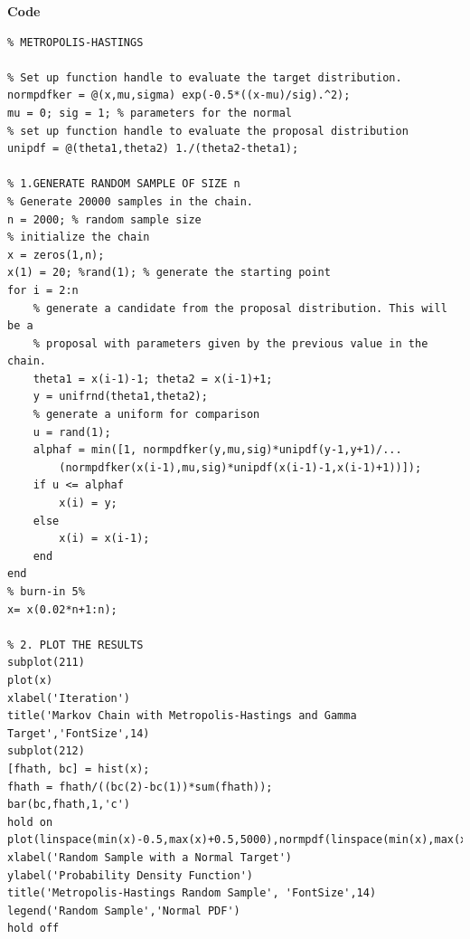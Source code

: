 \documentclass[12pt,a4paper]{article}
\begin{document}
\textbf{Code}
\begin{verbatim}
% METROPOLIS-HASTINGS

% Set up function handle to evaluate the target distribution.
normpdfker = @(x,mu,sigma) exp(-0.5*((x-mu)/sig).^2);
mu = 0; sig = 1; % parameters for the normal
% set up function handle to evaluate the proposal distribution
unipdf = @(theta1,theta2) 1./(theta2-theta1);

% 1.GENERATE RANDOM SAMPLE OF SIZE n
% Generate 20000 samples in the chain.
n = 2000; % random sample size
% initialize the chain
x = zeros(1,n);
x(1) = 20; %rand(1); % generate the starting point
for i = 2:n
    % generate a candidate from the proposal distribution. This will be a
    % proposal with parameters given by the previous value in the chain.
    theta1 = x(i-1)-1; theta2 = x(i-1)+1;
    y = unifrnd(theta1,theta2);
    % generate a uniform for comparison
    u = rand(1);
    alphaf = min([1, normpdfker(y,mu,sig)*unipdf(y-1,y+1)/...
        (normpdfker(x(i-1),mu,sig)*unipdf(x(i-1)-1,x(i-1)+1))]);
    if u <= alphaf
        x(i) = y;
    else
        x(i) = x(i-1);
    end
end
% burn-in 5%
x= x(0.02*n+1:n);

% 2. PLOT THE RESULTS
subplot(211)
plot(x)
xlabel('Iteration')
title('Markov Chain with Metropolis-Hastings and Gamma Target','FontSize',14)
subplot(212)
[fhath, bc] = hist(x);
fhath = fhath/((bc(2)-bc(1))*sum(fhath));
bar(bc,fhath,1,'c')
hold on
plot(linspace(min(x)-0.5,max(x)+0.5,5000),normpdf(linspace(min(x),max(x),5000),mu,sig),'b','LineWidth',2);
xlabel('Random Sample with a Normal Target')
ylabel('Probability Density Function')
title('Metropolis-Hastings Random Sample', 'FontSize',14)
legend('Random Sample','Normal PDF')
hold off
\end{verbatim}
\end{document}
